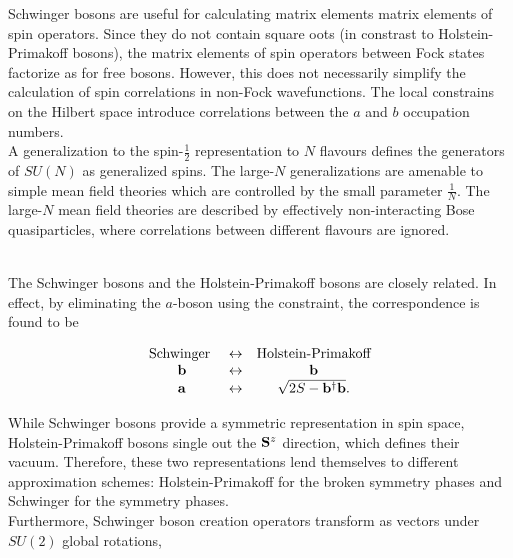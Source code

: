 \documentclass{homework}
\begin{document}
\begin{tcolorbox}[colback=my-blue, title = Physical Context]

Schwinger bosons are useful for calculating matrix elements matrix elements of spin operators. Since they do not contain square oots (in constrast to Holstein-Primakoff bosons), the matrix elements of spin operators between Fock states factorize as for free bosons. However, this does not necessarily simplify the calculation of spin correlations in non-Fock wavefunctions. The local constrains on the Hilbert space introduce correlations between the $a$ and $b$ occupation numbers. \\

A generalization to the spin-$\frac{1}{2}$ representation to $N$ flavours defines the generators of $SU(N)$ as generalized spins. The large-$N$ generalizations are amenable to simple mean field theories which are controlled by the small parameter $\frac{1}{N}$. The large-$N$ mean field theories are described by effectively non-interacting Bose quasiparticles, where correlations between different flavours are ignored.

\end{tcolorbox}

\blanky\\

The Schwinger bosons and the Holstein-Primakoff bosons are closely related. In effect, by eliminating the $a$-boson using the constraint, the correspondence is found to be 

\begin{equation}
    \begin{array}{ccc}
         \textnormal{Schwinger } & \leftrightarrow & \textnormal{Holstein-Primakoff} \\
         {\bf b} & \leftrightarrow & {\bf b}\\
         {\bf a} & \leftrightarrow & \sqrt{2S - {\bf b}^\dagger {\bf b}}.
    \end{array}
\end{equation}

While Schwinger bosons provide a symmetric representation in spin space, Holstein-Primakoff bosons single out the ${\bf S}^z$ direction, which defines their vacuum. Therefore, these two representations lend themselves to different approximation schemes: Holstein-Primakoff for the broken symmetry phases and Schwinger for the symmetry phases. \\

Furthermore, Schwinger boson creation operators transform as vectors under $SU(2)$ global rotations,
\end{document}
